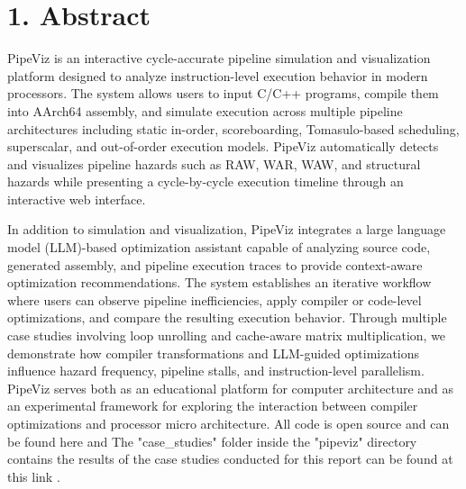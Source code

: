 \section*{1. Abstract}
PipeViz is an interactive cycle-accurate pipeline simulation and visualization platform designed to analyze instruction-level execution behavior in modern processors. The system allows users to input C/C++ programs, compile them into AArch64 assembly, and simulate execution across multiple pipeline architectures including static in-order, scoreboarding, Tomasulo-based scheduling, superscalar, and out-of-order execution models. PipeViz automatically detects and visualizes pipeline hazards such as RAW, WAR, WAW, and structural hazards while presenting a cycle-by-cycle execution timeline through an interactive web interface.

In addition to simulation and visualization, PipeViz integrates a large language model (LLM)-based optimization assistant capable of analyzing source code, generated assembly, and pipeline execution traces to provide context-aware optimization recommendations. The system establishes an iterative workflow where users can observe pipeline inefficiencies, apply compiler or code-level optimizations, and compare the resulting execution behavior. Through multiple case studies involving loop unrolling and cache-aware matrix multiplication, we demonstrate how compiler transformations and LLM-guided optimizations influence hazard frequency, pipeline stalls, and instruction-level parallelism. PipeViz serves both as an educational platform for computer architecture and as an experimental framework for exploring the interaction between compiler optimizations and processor micro architecture. All code is open source and can be found here \cite{github-repo} and The "case\_studies" folder inside the "pipeviz" directory contains the results of the case studies conducted for this report can be found at this link \cite{case-studies}.